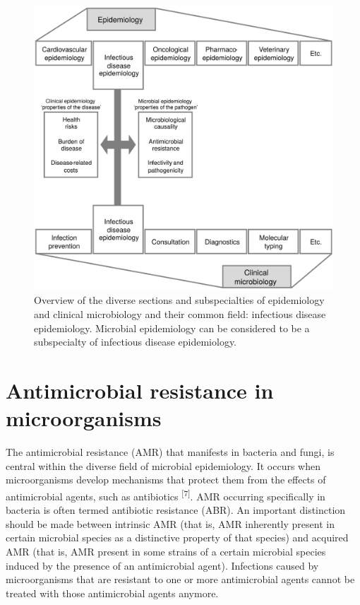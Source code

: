 \documentclass[
]{book}
\begin{document}
\begin{figure}

{\centering \includegraphics[width=1\linewidth]{images/01-02} 

}

\caption{Overview of the diverse sections and subspecialties of epidemiology and clinical microbiology and their common field: infectious disease epidemiology. Microbial epidemiology can be considered to be a subspecialty of infectious disease epidemiology.}\label{fig:fig1-2}
\end{figure}

\hypertarget{antimicrobial-resistance-in-microorganisms}{%
\section{Antimicrobial resistance in microorganisms}\label{antimicrobial-resistance-in-microorganisms}}

The antimicrobial resistance (AMR) that manifests in bacteria and fungi, is central within the diverse field of microbial epidemiology. It occurs when microorganisms develop mechanisms that protect them from the effects of antimicrobial agents, such as antibiotics \textsuperscript{{[}7{]}}. AMR occurring specifically in bacteria is often termed antibiotic resistance (ABR). An important distinction should be made between intrinsic AMR (that is, AMR inherently present in certain microbial species as a distinctive property of that species) and acquired AMR (that is, AMR present in some strains of a certain microbial species induced by the presence of an antimicrobial agent). Infections caused by microorganisms that are resistant to one or more antimicrobial agents cannot be treated with those antimicrobial agents anymore.
\end{document}
